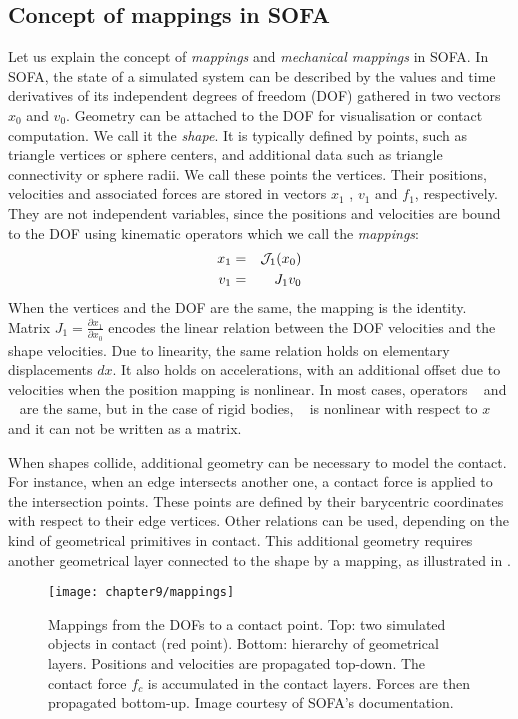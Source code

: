 	\subsection{Concept of mappings in SOFA}	\label{chap9:mappings}
Let us explain the concept of \emph{mappings} and \emph{mechanical mappings} in SOFA. In SOFA, the state of a simulated system can be described by the values and time derivatives of its independent degrees of freedom (DOF) gathered in two vectors $x_0$ and $v_0$. Geometry can be attached to the DOF for visualisation or contact computation. We call it the \emph{shape}. It is typically defined by points, such as triangle vertices or sphere centers, and additional data such as triangle connectivity or sphere radii. We call these points the vertices. Their positions, velocities and associated forces are stored in vectors $x_1$ , $v_1$ and $f_1$, respectively. They are not independent variables, since the positions and velocities are bound to the DOF using kinematic operators which we call the \emph{mappings}:
\begin{eqnarray*}
x_1 &=&\mathcal{J}_1(x_0)\\ 
v_1 &=& J_1 v_0
\end{eqnarray*}
When the vertices and the DOF are the same, the mapping is the identity. Matrix $J_1 = \frac{\partial x_1}{\partial x_0}$ encodes the linear relation between the DOF velocities and the shape velocities. Due to linearity, the same relation holds on elementary displacements $dx$. It also holds on accelerations, with an additional offset due to velocities when the position mapping \JNL is nonlinear. In most cases, operators \JNL~ and \J~ are the same, but in the case of rigid bodies, \JNL~ is nonlinear with respect to $x$ and it can not be written as a matrix.

When shapes collide, additional geometry can be necessary to model the contact. For instance, when an edge intersects another one, a contact force is applied to the intersection points. These points are defined by their barycentric coordinates with respect to their edge vertices. Other relations can be used, depending on the kind of geometrical primitives in contact. This additional geometry requires another geometrical layer connected to the shape by a mapping, as illustrated in .

\begin{figure}
	\begin{center}
 		\texttt{[image: chapter9/mappings]}
 	\end{center}
 \caption[Concept of mappings in SOFA]{Mappings from the DOFs to a contact point. Top: two simulated objects in contact (red point). Bottom: hierarchy of geometrical layers. Positions and velocities are propagated top-down. The contact force $f_c$ is accumulated in the contact layers. Forces are then propagated bottom-up. Image courtesy of SOFA's documentation. }
\label{chap9:fig-mappings}
\end{figure}

